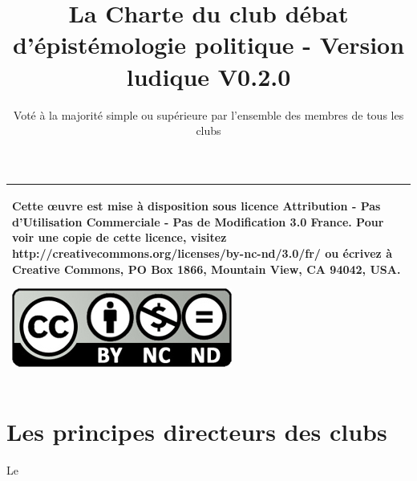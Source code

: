 \documentclass[a4paper,12pt]{article}
\title{\Huge{La Charte du club débat d'épistémologie politique - Version ludique} \LARGE{V0.2.0}}
\author{Voté à la majorité simple ou supérieure par l'ensemble des membres de tous les clubs}
\begin{document}
\maketitle

\begin{tabular}{|p{}|}
 \hline
 Cette œuvre est mise à disposition sous licence Attribution - Pas d’Utilisation Commerciale - Pas de Modification 3.0 France. Pour voir une copie de cette licence, visitez http://creativecommons.org/licenses/by-nc-nd/3.0/fr/ ou écrivez à Creative Commons, PO Box 1866, Mountain View, CA 94042, USA.
 \begin{center}
 \includegraphics[scale=1]{cc.jpg}
 \end{center}\\
 \hline
\end{tabular}

\newpage
\tableofcontents
\newpage

\part{Les principes directeurs des clubs}

Le 
\end{document}
